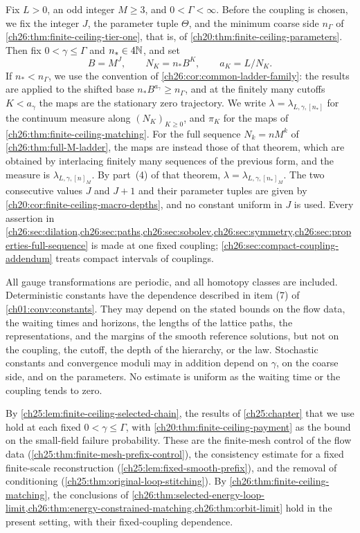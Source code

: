 Fix $L>0$, an odd integer $M\ge3$, and $0<\Gamma<\infty$. Before the coupling is chosen, we fix the integer $J$, the parameter tuple $\Theta$, and the minimum coarse side $n_\Gamma$ of \cref{ch26:thm:finite-ceiling-tier-one}, that is, of \cref{ch20:thm:finite-ceiling-parameters}. Then fix $0<\gamma\le\Gamma$ and $n_*\in4\mathbb N$, and set
\[
 B=M^J,\qquad N_K=n_*B^K,\qquad a_K=L/N_K.
\]
If $n_*<n_\Gamma$, we use the convention of \cref{ch26:cor:common-ladder-family}: the results are applied to the shifted base $n_*B^{a_\gamma}\ge n_\Gamma$, and at the finitely many cutoffs $K<a_\gamma$ the maps are the stationary zero trajectory. We write $\lambda=\lambda_{L,\gamma,[n_*]}$ for the continuum measure along $(N_K)_{K\ge0}$, and $\pi_K$ for the maps of \cref{ch26:thm:finite-ceiling-matching}. For the full sequence $N_k=nM^k$ of \cref{ch26:thm:full-M-ladder}, the maps are instead those of that theorem, which are obtained by interlacing finitely many sequences of the previous form, and the measure is $\lambda_{L,\gamma,[n]_M}$. By part~(4) of that theorem, $\lambda=\lambda_{L,\gamma,[n_*]_M}$. The two consecutive values $J$ and $J+1$ and their parameter tuples are given by \cref{ch20:cor:finite-ceiling-macro-depths}, and no constant uniform in $J$ is used. Every assertion in \cref{ch26:sec:dilation,ch26:sec:paths,ch26:sec:sobolev,ch26:sec:symmetry,ch26:sec:properties-full-sequence} is made at one fixed coupling; \cref{ch26:sec:compact-coupling-addendum} treats compact intervals of couplings.

All gauge transformations are periodic, and all homotopy classes are included. Deterministic constants have the dependence described in item (7) of \cref{ch01:conv:constants}. They may depend on the stated bounds on the flow data, the waiting times and horizons, the lengths of the lattice paths, the representations, and the margins of the smooth reference solutions, but not on the coupling, the cutoff, the depth of the hierarchy, or the law. Stochastic constants and convergence moduli may in addition depend on $\gamma$, on the coarse side, and on the parameters. No estimate is uniform as the waiting time or the coupling tends to zero.

By \cref{ch25:lem:finite-ceiling-selected-chain}, the results of \cref{ch25:chapter} that we use hold at each fixed $0<\gamma\le\Gamma$, with \cref{ch20:thm:finite-ceiling-payment} as the bound on the small-field failure probability. These are the finite-mesh control of the flow data (\cref{ch25:thm:finite-mesh-prefix-control}), the consistency estimate for a fixed finite-scale reconstruction (\cref{ch25:lem:fixed-smooth-prefix}), and the removal of conditioning (\cref{ch25:thm:original-loop-stitching}). By \cref{ch26:thm:finite-ceiling-matching}, the conclusions of \cref{ch26:thm:selected-energy-loop-limit,ch26:thm:energy-constrained-matching,ch26:thm:orbit-limit} hold in the present setting, with their fixed-coupling dependence.

